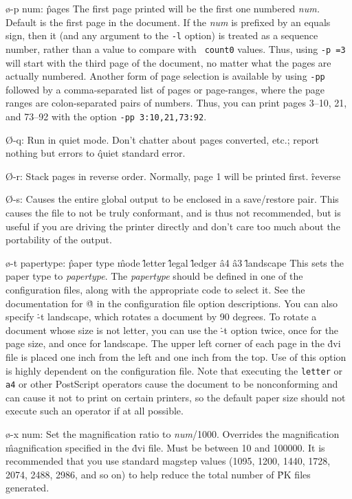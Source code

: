 {\o-p num:
\^{pages}
The first page printed will be the first one numbered {\it num.}
Default is the first page in the document.  If the {\it num} is
prefixed by an equals sign, then it (and any argument to the {\tt -l}
option) is treated as a sequence number, rather than a value to
compare with {\tt {} count0} values.  Thus, using {\tt -p =3}
will start with the third page of the document, no matter what the
pages are actually numbered.  Another form of page selection is
available by using {\tt -pp} followed by a comma-separated list of
pages or page-ranges, where the page ranges are colon-separated pairs
of numbers.  Thus, you can print pages 3--10, 21, and 73--92 with the
option {\tt -pp 3:10,21,73:92}.

\O-q: Run in quiet mode.
Don't chatter about pages converted, etc.; report nothing but errors to
\^{quiet}
standard error.

\O-r:
Stack pages in reverse order.  Normally, page 1 will be printed first.
\^{reverse}

\O-s:
Causes the entire global output to be enclosed in a save/restore pair.
This causes the file to not be truly conformant, and is thus not recommended,
but is useful if you are driving the printer directly and don't care too
much about the portability of the output.

\o-t papertype:
\^{paper type}
\^{mode}
\^{letter}
\^{legal}
\^{ledger}
\^{a4}
\^{a3}
\^{landscape}
This sets the paper type to {\it papertype}.  The {\it papertype} should
be defined in one of the configuration files, along with the appropriate
code to select it.  See the documentation for \.@ in the configuration
file option descriptions.  You can also specify
\.{-t landscape}, which rotates a document by 90 degrees.
To rotate a document whose size is not letter, you can use the
\.{-t} option twice, once for the page size, and once for \.{landscape}.
The upper left corner of each page in
the \.{dvi} file is placed one inch from the left and one inch from the top.
Use of this option is highly dependent on the configuration file.
Note that executing the {\tt letter} or {\tt a4} or other PostScript
operators cause the document to be nonconforming and can cause it not
to print on certain printers, so the default paper size should not
execute such an operator if at all possible.

\o-x num:
Set the magnification ratio to {\it num}/1000. Overrides the magnification
\^{magnification}
specified in the \.{dvi} file.	Must be between 10 and 100000.	It is
recommended that you use standard magstep values (1095, 1200, 1440, 1728,
2074, 2488, 2986, and so on) to help reduce the total number of \.{PK}
files generated.

}
